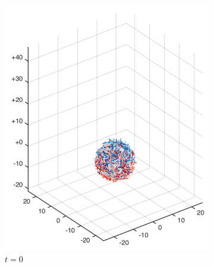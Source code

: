 \begin{figure}[!htbp]
  \centering
  \begin{subfigure}[h]{0.24\textwidth}
    \centering
    \includegraphics[width=\textwidth]{img/mixing/random_00000.pdf}
    \caption{$t=0$}\label{fig:mixing_random_a}
  \end{subfigure}
  \begin{subfigure}[h]{0.24\textwidth}
    \centering

\end{subfigure}
\end{figure}
